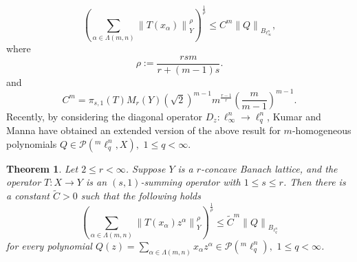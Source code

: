 \documentclass[a4paper,12pt]{amsart}
\newtheorem{thm}{Theorem}[section]
\theoremstyle{definition}
\newcommand{\norm}[1]{\left\lVert#1\right\rVert}
\begin{document}
\begin{equation*}
	\left(\sum_{\alpha \in\Lambda(m,n)}\norm{T(x_{\alpha})}^{\rho}_{Y}\right)^{\frac{1}{\rho}}\leq C^m\norm{Q}_{B_{\ell^n_{\infty}}},
\end{equation*}
where 
\begin{equation*}
	\rho:=\frac{rsm}{r+(m-1)s}.
\end{equation*}
and
\begin{equation*}
	C^m=\pi_{s,1}(T)M_{r}(Y)(\sqrt{2})^{m-1}m^{\frac{r-1}{r}}\left(\frac{m}{m-1}\right)^{m-1}.
\end{equation*}
Recently, by considering the diagonal operator $D_{z}:\ell^n_{\infty}\rightarrow \ell^n_{q}$, Kumar and Manna \cite{kumar-2023-arxiv} have obtained an extended version of the above result for $m$-homogeneous polynomials $Q\in \mathcal{P}(^m\ell^n_q,X), \,\, 1\leq q<\infty$.

\begin{thm}\cite{kumar-2023-arxiv}\label{Kumar-thm-arxiv}
	Let $2\leq r<\infty$. Suppose $Y$ is a $r$-concave Banach lattice, and the operator $T:X\rightarrow Y$ is an $(s,1)$-summing operator with $1\leq s\leq r$. Then there is a constant $\widetilde{C}>0$ such that the following holds
	\begin{equation*}
		\left(\sum_{\alpha \in\Lambda(m,n)}\norm{T(x_{\alpha})z^{\alpha}}^{\rho}_{Y}\right)^{\frac{1}{\rho}}\leq \widetilde{C}^m\norm{Q}_{B_{\ell^n_{q}}}
	\end{equation*}
	for every polynomial $Q(z)=\sum_{\alpha \in\Lambda(m,n)}x_{\alpha}z^{\alpha}\in \mathcal{P}(^m\ell^n_{q}),\,\, 1\leq q<\infty$.
\end{thm}
\end{document}
